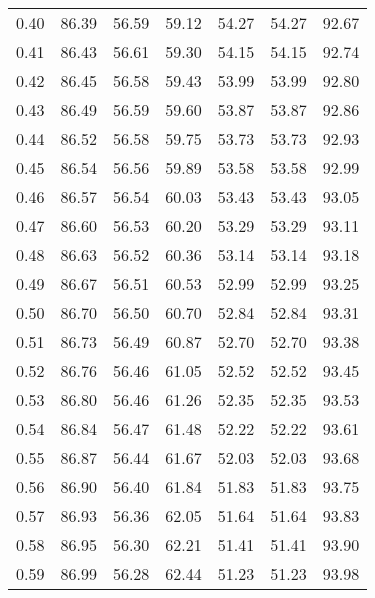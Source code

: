 \begin{tabular}{|c|c|c|c|c|c|c|}
      0.40 &     86.39 &     56.59 &      59.12 &   54.27 &      54.27 &         92.67 \\
      0.41 &     86.43 &     56.61 &      59.30 &   54.15 &      54.15 &         92.74 \\
      0.42 &     86.45 &     56.58 &      59.43 &   53.99 &      53.99 &         92.80 \\
      0.43 &     86.49 &     56.59 &      59.60 &   53.87 &      53.87 &         92.86 \\
      0.44 &     86.52 &     56.58 &      59.75 &   53.73 &      53.73 &         92.93 \\
      0.45 &     86.54 &     56.56 &      59.89 &   53.58 &      53.58 &         92.99 \\
      0.46 &     86.57 &     56.54 &      60.03 &   53.43 &      53.43 &         93.05 \\
      0.47 &     86.60 &     56.53 &      60.20 &   53.29 &      53.29 &         93.11 \\
      0.48 &     86.63 &     56.52 &      60.36 &   53.14 &      53.14 &         93.18 \\
      0.49 &     86.67 &     56.51 &      60.53 &   52.99 &      52.99 &         93.25 \\
      0.50 &     86.70 &     56.50 &      60.70 &   52.84 &      52.84 &         93.31 \\
      0.51 &     86.73 &     56.49 &      60.87 &   52.70 &      52.70 &         93.38 \\
      0.52 &     86.76 &     56.46 &      61.05 &   52.52 &      52.52 &         93.45 \\
      0.53 &     86.80 &     56.46 &      61.26 &   52.35 &      52.35 &         93.53 \\
      0.54 &     86.84 &     56.47 &      61.48 &   52.22 &      52.22 &         93.61 \\
      0.55 &     86.87 &     56.44 &      61.67 &   52.03 &      52.03 &         93.68 \\
      0.56 &     86.90 &     56.40 &      61.84 &   51.83 &      51.83 &         93.75 \\
      0.57 &     86.93 &     56.36 &      62.05 &   51.64 &      51.64 &         93.83 \\
      0.58 &     86.95 &     56.30 &      62.21 &   51.41 &      51.41 &         93.90 \\
      0.59 &     86.99 &     56.28 &      62.44 &   51.23 &      51.23 &         93.98 \\

\end{tabular}
